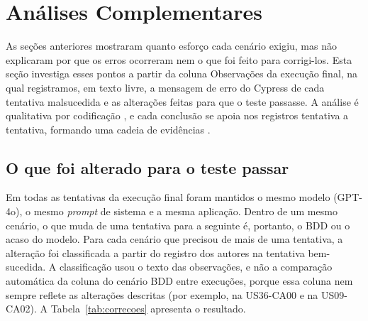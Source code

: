 \section{Análises Complementares}

\label{sec:analises-complementares}

As seções anteriores mostraram quanto esforço cada cenário exigiu, mas não explicaram por que os erros ocorreram nem o que foi feito para corrigi-los. Esta seção investiga esses pontos a partir da coluna Observações da execução final, na qual registramos, em texto livre, a mensagem de erro do Cypress de cada tentativa malsucedida e as alterações feitas para que o teste passasse. A análise é qualitativa por codificação \cite[Cap.~7.7.2, p.~99--101]{Wohlin2012}, e cada conclusão se apoia nos registros tentativa a tentativa, formando uma cadeia de evidências \cite[p.~99]{Wohlin2012}.

\subsection{O que foi alterado para o teste passar}
\label{subsec:correcoes}

Em todas as tentativas da execução final foram mantidos o mesmo modelo (GPT-4o), o mesmo \textit{prompt} de sistema e a mesma aplicação. Dentro de um mesmo cenário, o que muda de uma tentativa para a seguinte é, portanto, o BDD ou o acaso do modelo. Para cada cenário que precisou de mais de uma tentativa, a alteração foi classificada a partir do registro dos autores na tentativa bem-sucedida. A classificação usou o texto das observações, e não a comparação automática da coluna do cenário BDD entre execuções, porque essa coluna nem sempre reflete as alterações descritas (por exemplo, na US36-CA00 e na US09-CA02). A Tabela~\ref{tab:correcoes} apresenta o resultado.

